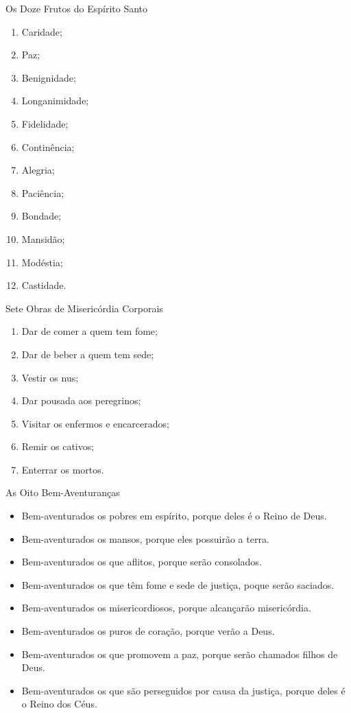 \documentclass{book}
\begin{document}
\newpage
\begin{center}
    Os Doze Frutos do Espírito Santo
\end{center}
\begin{enumerate}
    \item Caridade;
    \item Paz;
    \item Benignidade;
    \item Longanimidade;
    \item Fidelidade;
    \item Continência;
    \item Alegria;
    \item Paciência;
    \item Bondade;
    \item Mansidão;
    \item Modéstia;
    \item Castidade.
\end{enumerate}
\begin{center}
    Sete Obras de Misericórdia Corporais
\end{center}
\begin{enumerate}
    \item Dar de comer a quem tem fome;
    \item Dar de beber a quem tem sede;
    \item Vestir os nus;
    \item Dar pousada aos peregrinos;
    \item Visitar os enfermos e encarcerados;
    \item Remir os cativos;
    \item Enterrar os mortos.
\end{enumerate}
\newpage
\begin{center}
    As Oito Bem-Aventuranças
\end{center}
\begin{itemize}
    \item Bem-aventurados os pobres em espírito, porque deles é o Reino de Deus.
    \item Bem-aventurados os mansos, porque eles possuirão a terra.
    \item Bem-aventurados os que aflitos, porque serão consolados.
    \item Bem-aventurados os que têm fome e sede de justiça, poque serão saciados.
    \item Bem-aventurados os misericordiosos, porque alcançarão misericórdia.
    \item Bem-aventurados os puros de coração, porque verão a Deus.
    \item Bem-aventurados os que promovem a paz, porque serão chamados filhos de Deus.
    \item Bem-aventurados os que são perseguidos por causa da justiça, porque deles é o Reino dos Céus.
\end{itemize}
\end{document}
